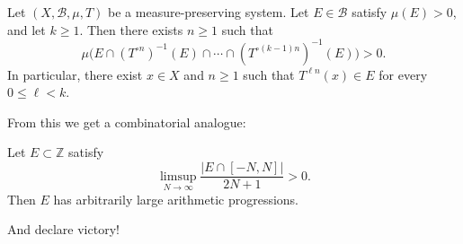\documentclass[11pt,a4paper]{article}
\begin{document}
\setcounter{theorem}{1}\begin{theorem}
Let $(X,\mathcal B,\mu,T)$ be a measure-preserving system. Let
$E\in\mathcal B$ satisfy $\mu(E)>0$, and let $k\geq1$. Then there exists
$n\geq1$ such that
\[
  \mu\bigl(E\cap(T^{\circ n})^{-1}(E)\cap\cdots\cap
  (T^{\circ(k-1)n})^{-1}(E)\bigr)>0.
\]
In particular, there exist $x\in X$ and $n\geq1$ such that $T^{\ell n}(x)\in E$
for every $0\leq\ell<k$.
\end{theorem}
From this we get a combinatorial analogue:
\setcounter{theorem}{2}\begin{theorem}
Let $E\subset\mathbb Z$ satisfy
\[
  \limsup_{N\to\infty}\frac{|E\cap[-N,N]|}{2N+1}>0.
\]
Then $E$ has arbitrarily large arithmetic progressions.
\end{theorem}
And declare victory!
\end{document}
